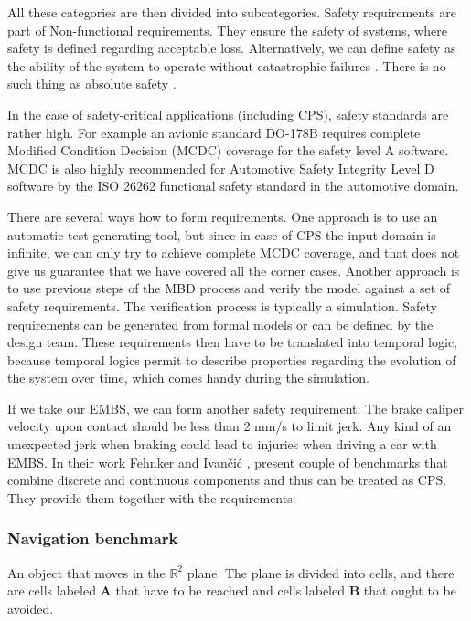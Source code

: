 All these categories are then divided into subcategories. Safety requirements are part of Non-functional requirements. They ensure the safety of systems, where safety is defined regarding acceptable loss. Alternatively, we can define safety as the ability of the system to operate without catastrophic failures \cite{Sommerville:SoftwareEngineering}. There is no such thing as absolute safety \cite{Leveson:SystemSafety}.

In the case of safety-critical applications (including CPS), safety standards are rather high. For example an avionic standard DO-178B \cite{Maxey:AvionicStandardDO178B} requires complete Modified Condition Decision (MCDC) \cite{Chilenski:MCDC} coverage for the safety level A software. MCDC is also highly recommended for Automotive Safety Integrity Level D software by the ISO 26262 functional safety standard \cite{ISO26262} in the automotive domain.

There are several ways how to form requirements. One approach is to use an automatic test generating tool, but since in case of CPS the input domain is infinite, we can only try to achieve complete MCDC coverage, and that does not give us guarantee that we have covered all the corner cases. Another approach is to use previous steps of the MBD process and verify the model against a set of safety requirements. The verification process is typically a simulation. Safety requirements can be generated from formal models or can be defined by the design team. These requirements then have to be translated into temporal logic, because temporal logics permit to describe properties regarding the evolution of the system over time, which comes handy during the simulation.

If we take our EMBS, we can form another safety requirement: The brake caliper velocity upon contact should be less than 2 mm/s to limit jerk. Any kind of an unexpected jerk when braking could lead to injuries when driving a car with EMBS. In their work Fehnker and Ivančić \cite{Fehnker:BenchmarksHybridSystems}, present couple of benchmarks that combine discrete and continuous components and thus can be treated as CPS. They provide them together with the requirements:

\subsubsection{Navigation benchmark}

An object that moves in the ${\mathbb{R}}^2$ plane. The plane is divided into cells, and there are cells labeled \textbf{A} that have to be reached and cells labeled \textbf{B} that ought to be avoided.


